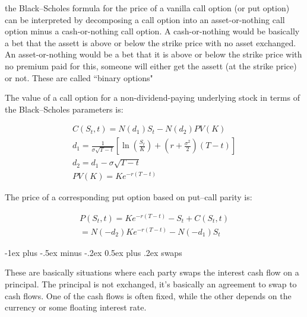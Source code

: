 \documentclass[10pt,landscape]{article}
\makeatletter
\renewcommand{\section}{\@startsection{section}{1}{0mm}%
                                {-1ex plus -.5ex minus -.2ex}%
                                {0.5ex plus .2ex}%
                                {\normalfont\large\bfseries}}
\makeatother
\begin{document}
\begin{multicols}{3}
\vspace{0.15cm}

the Black–Scholes formula for the price of a vanilla call option (or put option) can be interpreted by decomposing a call option into an asset-or-nothing call option minus a cash-or-nothing call option. A cash-or-nothing would be basically a bet that the assett is above or below the strike price with no asset exchanged. An asset-or-nothing would be a bet that it is above or below the strike price with no premium paid for this, someone will either get the assett (at the strike price) or not. These are called ``binary options"

\vspace{0.15cm}

The value of a call option for a non-dividend-paying underlying stock in terms of the Black–Scholes parameters is:

\vspace{0.15cm}

\begin{align}
C(S_t, t)  = N(d_1)S_t - N(d_2) PV(K) \\
d_1  = \frac{1}{\sigma\sqrt{T - t}}\left[\ln\left(\frac{S_t}{K}\right) + \left(r + \frac{\sigma^2}{2}\right)(T - t)\right] \\
d_2  = d_1 - \sigma\sqrt{T - t} \\
PV(K)  =Ke^{-r(T - t)}
\end{align}

\vspace{0.15cm}


The price of a corresponding put option based on put–call parity is:

\vspace{0.15cm}

\begin{align}
P(S_t, t) = Ke^{-r(T - t)} - S_t + C(S_t, t) \\
= N(-d_2) Ke^{-r(T - t)} - N(-d_1) S_t
\end{align}


\section{swaps}

These are basically situations where each party swaps the interest cash flow on a principal. The principal is not exchanged, it's basically an agreement to swap to cash flows. One of the cash flows is often fixed, while the other depends on the currency or some floating interest rate.


\end{multicols}
\end{document}
